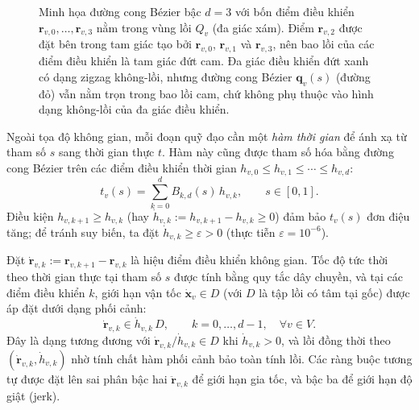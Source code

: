 \begin{figure}[htbp]
    \caption[Đường cong Bézier nằm trong bao lồi của các điểm điều khiển]{%
        Minh họa đường cong Bézier bậc $d=3$ với bốn điểm điều khiển
        $\mathbf{r}_{v,0},\ldots,\mathbf{r}_{v,3}$ nằm trong vùng lồi $Q_v$
        (đa giác xám). Điểm $\mathbf{r}_{v,2}$ được đặt bên trong tam giác
        tạo bởi $\mathbf{r}_{v,0}$, $\mathbf{r}_{v,1}$ và $\mathbf{r}_{v,3}$,
        nên bao lồi của các điểm điều khiển là tam giác đứt cam. Đa giác điều
        khiển đứt xanh có dạng zigzag không-lồi, nhưng đường cong Bézier
        $\mathbf{q}_v(s)$ (đường đỏ) vẫn nằm trọn trong bao lồi cam, chứ không
        phụ thuộc vào hình dạng không-lồi của đa giác điều khiển.}
    \label{fig:bezier_convex_hull}
\end{figure}

Ngoài tọa độ không gian, mỗi đoạn quỹ đạo cần một \emph{hàm thời gian} để ánh
xạ từ tham số $s$ sang thời gian thực $t$. Hàm này cũng được tham số hóa bằng
đường cong Bézier trên các điểm điều khiển thời gian $h_{v,0} \le h_{v,1} \le
    \cdots \le h_{v,d}$:
\begin{equation}
    t_v(s)
    = \sum_{k=0}^{d} B_{k,d}(s)\, h_{v,k},
    \qquad s \in [0,1].
    \label{eq:time_bezier}
\end{equation}
Điều kiện $h_{v,k+1} \ge h_{v,k}$ (hay $\dot{h}_{v,k} := h_{v,k+1} - h_{v,k}
    \ge 0$) đảm bảo $t_v(s)$ đơn điệu tăng; để tránh suy biến, ta đặt
$\dot{h}_{v,k} \ge \varepsilon > 0$ (thực tiễn $\varepsilon = 10^{-6}$).

Đặt $\dot{\mathbf{r}}_{v,k} := \mathbf{r}_{v,k+1} - \mathbf{r}_{v,k}$ là hiệu
điểm điều khiển không gian. Tốc độ tức thời theo thời gian thực tại tham số $s$
được tính bằng quy tắc dây chuyền, và tại các điểm điều khiển $k$, giới hạn vận
tốc $\dot{\mathbf{x}}_v \in D$ (với $D$ là tập lồi có tâm tại gốc) được áp đặt
dưới dạng phối cảnh:
\begin{equation}
    \dot{\mathbf{r}}_{v,k} \in \dot{h}_{v,k}\, D,
    \qquad k = 0, \ldots, d-1,\quad \forall v \in V.
    \label{eq:vel_perspective}
\end{equation}
Đây là dạng tương đương với $\dot{\mathbf{r}}_{v,k}/\dot{h}_{v,k} \in D$ khi
$\dot{h}_{v,k} > 0$, và lồi đồng thời theo $(\dot{\mathbf{r}}_{v,k},
    \dot{h}_{v,k})$ nhờ tính chất hàm phối cảnh bảo toàn tính lồi.
Các ràng buộc tương tự được đặt lên sai phân bậc hai $\ddot{\mathbf{r}}_{v,k}$
để giới hạn gia tốc, và bậc ba để giới hạn độ giật (jerk).

